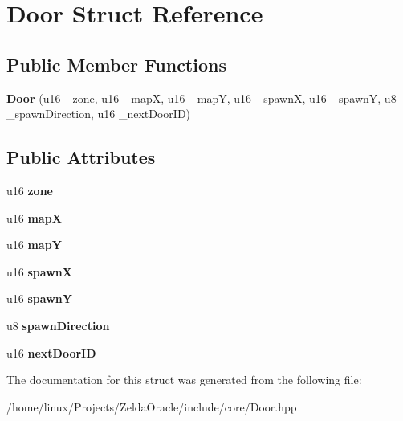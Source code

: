\hypertarget{structDoor}{\section{Door Struct Reference}
\label{structDoor}
}
\subsection*{Public Member Functions}
\begin{DoxyCompactItemize}
\item 
\hypertarget{structDoor_a723f70412fbe3ded0805cde7d7371fdf}{{\bfseries Door} (u16 \+\_\+zone, u16 \+\_\+map\+X, u16 \+\_\+map\+Y, u16 \+\_\+spawn\+X, u16 \+\_\+spawn\+Y, u8 \+\_\+spawn\+Direction, u16 \+\_\+next\+Door\+I\+D)}\label{structDoor_a723f70412fbe3ded0805cde7d7371fdf}

\end{DoxyCompactItemize}
\subsection*{Public Attributes}
\begin{DoxyCompactItemize}
\item 
\hypertarget{structDoor_a62311e6c5ca163f59ee57c43a7bea4f6}{u16 {\bfseries zone}}\label{structDoor_a62311e6c5ca163f59ee57c43a7bea4f6}

\item 
\hypertarget{structDoor_a23761a863c0edd0844e069b4eb3b60a0}{u16 {\bfseries map\+X}}\label{structDoor_a23761a863c0edd0844e069b4eb3b60a0}

\item 
\hypertarget{structDoor_ace027e69fcd8dd0161a14727d0c9e5e4}{u16 {\bfseries map\+Y}}\label{structDoor_ace027e69fcd8dd0161a14727d0c9e5e4}

\item 
\hypertarget{structDoor_a2646b7b6376c3ec3089e9bc6b1c731a9}{u16 {\bfseries spawn\+X}}\label{structDoor_a2646b7b6376c3ec3089e9bc6b1c731a9}

\item 
\hypertarget{structDoor_acfad1de98748fcfaebd02415da9b6e05}{u16 {\bfseries spawn\+Y}}\label{structDoor_acfad1de98748fcfaebd02415da9b6e05}

\item 
\hypertarget{structDoor_a6efb884a2953fc77ba638ff4282da949}{u8 {\bfseries spawn\+Direction}}\label{structDoor_a6efb884a2953fc77ba638ff4282da949}

\item 
\hypertarget{structDoor_ab07bba0421e928507e98ac5619f966dc}{u16 {\bfseries next\+Door\+I\+D}}\label{structDoor_ab07bba0421e928507e98ac5619f966dc}

\end{DoxyCompactItemize}


The documentation for this struct was generated from the following file\+:\begin{DoxyCompactItemize}
\item 
/home/linux/\+Projects/\+Zelda\+Oracle/include/core/Door.\+hpp\end{DoxyCompactItemize}
